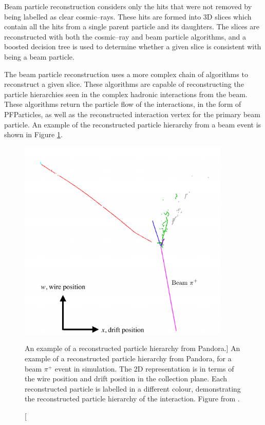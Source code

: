 \noindent
Beam particle reconstruction considers only the hits that were not removed by 
being labelled as clear cosmic--rays. These hits are formed into 3D slices which
contain all the hits from a single parent particle and its daughters. The
slices are reconstructed with both the cosmic--ray and beam particle
algorithms, and a boosted decision tree is used to determine whether a 
given slice is consistent with being a beam particle\cite{protoduneperf}. 

The beam particle reconstruction uses a more complex chain of algorithms
to reconstruct a given slice. These algorithms are capable of reconstructing 
the particle hierarchies seen in the complex hadronic interactions from the 
\protodune{} beam. These algorithms return the particle flow of the 
interactions, in the form of PFParticles, as well as the reconstructed 
interaction vertex for the primary beam particle. An example of the 
reconstructed particle hierarchy from a \protodune{} beam event is shown in 
Figure \ref{fig:pandora_pfp}.

\begin{figure}

	\centering

	\includegraphics[width=0.9\textwidth]{figures/pandoraEvent.pdf}

	\caption
	[An example of a reconstructed particle hierarchy from Pandora.]
	{An example of a reconstructed particle hierarchy from Pandora, for a beam
	$\pi^+$ event in \protodune{} simulation. The 2D representation is in terms 
	of the wire position and drift position in the collection plane. Each 
	reconstructed particle is labelled in a different colour, demonstrating the 
	reconstructed particle hierarchy of the interaction. Figure from 
	\cite{protoduneperf}.}

	\label{fig:pandora_pfp}

\end{figure}

